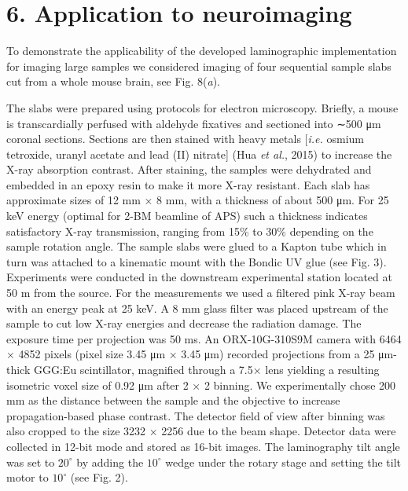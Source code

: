 \documentclass{article}
\begin{document}
\section*{6. Application to neuroimaging}

To demonstrate the applicability of the developed laminographic implementation for imaging large samples we considered imaging of four sequential sample slabs cut from a whole mouse brain, see Fig. 8(\emph{a}).

The slabs were prepared using protocols for electron microscopy. Briefly, a mouse is transcardially perfused with aldehyde fixatives and sectioned into ∼500 μm coronal sections. Sections are then stained with heavy metals [\emph{i.e.} osmium tetroxide, uranyl acetate and lead (II) nitrate] (Hua \emph{et al.}, 2015) to increase the X-ray absorption contrast. After staining, the samples were dehydrated and embedded in an epoxy resin to make it more X-ray resistant. Each slab has approximate sizes of 12 mm × 8 mm, with a thickness of about 500 μm. For 25 keV energy (optimal for 2-BM beamline of APS) such a thickness indicates satisfactory X-ray transmission, ranging from 15\% to 30\% depending on the sample rotation angle. The sample slabs were glued to a Kapton tube which in turn was attached to a kinematic mount with the Bondic UV glue (see Fig. 3). Experiments were conducted in the downstream experimental station located at 50 m from the source. For the measurements we used a filtered pink X-ray beam with an energy peak at 25 keV. A 8 mm glass filter was placed upstream of the sample to cut low X-ray energies and decrease the radiation damage. The exposure time per projection was 50 ms. An ORX-10G-310S9M camera with 6464 × 4852 pixels (pixel size 3.45 μm × 3.45 μm) recorded projections from a 25 μm-thick GGG:Eu scintillator, magnified through a 7.5× lens yielding a resulting isometric voxel size of 0.92 μm after 2 × 2 binning. We experimentally chose 200 mm as the distance between the sample and the objective to increase propagation-based phase contrast. The detector field of view after binning was also cropped to the size 3232 × 2256 due to the beam shape. Detector data were collected in 12-bit mode and stored as 16-bit images. The laminography tilt angle was set to $20^\circ$ by adding the $10^\circ$ wedge under the rotary stage and setting the tilt motor to $10^\circ$ (see Fig. 2).
\end{document}
